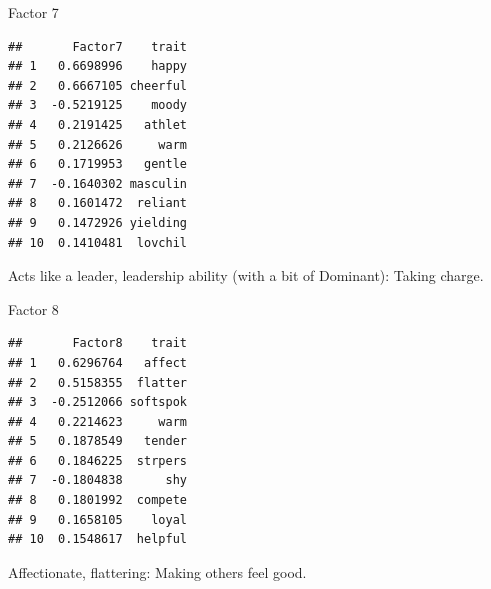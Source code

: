 \documentclass[ignorenonframetext,]{beamer}
\newenvironment{Shaded}{\begin{snugshade}}{\end{snugshade}}
\newcommand{\DecValTok}[1]{\textcolor[rgb]{0.00,0.00,0.81}{#1}}
\newcommand{\KeywordTok}[1]{\textcolor[rgb]{0.13,0.29,0.53}{\textbf{#1}}}
\newcommand{\NormalTok}[1]{#1}
\newcommand{\OperatorTok}[1]{\textcolor[rgb]{0.81,0.36,0.00}{\textbf{#1}}}
\newcommand{\StringTok}[1]{\textcolor[rgb]{0.31,0.60,0.02}{#1}}
\begin{document}
\begin{frame}[fragile]{Factor 7}
\protect\hypertarget{factor-7}{}

\footnotesize

\begin{Shaded}
\end{Shaded}

\begin{verbatim}
##       Factor7    trait
## 1   0.6698996    happy
## 2   0.6667105 cheerful
## 3  -0.5219125    moody
## 4   0.2191425   athlet
## 5   0.2126626     warm
## 6   0.1719953   gentle
## 7  -0.1640302 masculin
## 8   0.1601472  reliant
## 9   0.1472926 yielding
## 10  0.1410481  lovchil
\end{verbatim}

\normalsize

Acts like a leader, leadership ability (with a bit of Dominant): Taking
charge.

\end{frame}

\begin{frame}[fragile]{Factor 8}
\protect\hypertarget{factor-8}{}

\footnotesize

\begin{Shaded}
\end{Shaded}

\begin{verbatim}
##       Factor8    trait
## 1   0.6296764   affect
## 2   0.5158355  flatter
## 3  -0.2512066 softspok
## 4   0.2214623     warm
## 5   0.1878549   tender
## 6   0.1846225  strpers
## 7  -0.1804838      shy
## 8   0.1801992  compete
## 9   0.1658105    loyal
## 10  0.1548617  helpful
\end{verbatim}

\normalsize

Affectionate, flattering: Making others feel good.

\end{frame}
\end{document}
